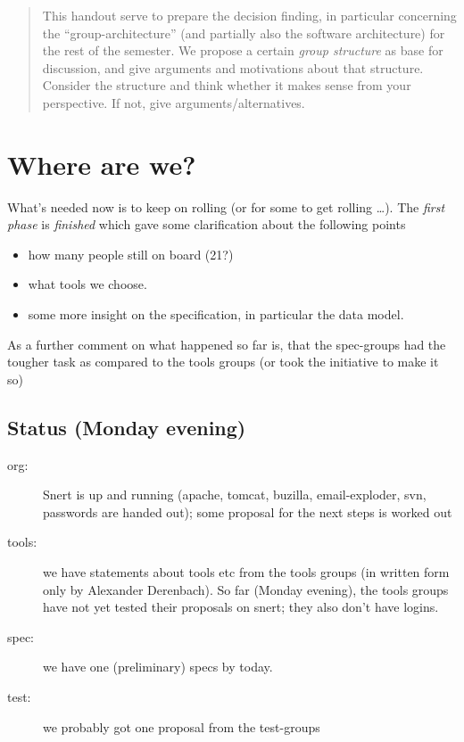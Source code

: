 \documentclass[11pt,handout,nologo]{handout}
\begin{document}
\thispagestyle{empty}





\begin{abstract}
  This handout serve to prepare the decision finding, in particular
  concerning the ``group-architecture'' (and partially also the software
  architecture) for the rest of the semester. We propose a certain
  \emph{group structure} as base for discussion, and give arguments and
  motivations about that structure.  Consider the structure and think
  whether it makes sense from your perspective. If not, give
  arguments/alternatives.
\end{abstract}

\section*{Where are we?}



What's needed now is to keep on rolling (or for some to get rolling
\ldots). The \emph{first phase} is \emph{finished} which gave some
clarification about the following points

\begin{itemize}
\item how many people still on board (21?)
\item what tools we choose.
\item some more insight on the specification, in particular the data model.
\end{itemize}

As a further comment on what happened so far is, that the spec-groups had
the tougher task as compared to the tools groups (or took the initiative to
make it so)


\subsection*{Status (Monday evening)}




\begin{description}
\item[org:] Snert is up and running (apache, tomcat, buzilla,
  email-exploder, svn, passwords are handed out); some proposal for the
  next steps is worked out
\item[tools:] we have statements about tools etc from the tools groups (in
  written form only by Alexander Derenbach). So far (Monday evening), the
  tools groups have not yet tested their proposals on snert; they also
  don't have logins.
\item[spec:] we have one (preliminary) specs by today.
\item[test:] we probably got one proposal from the test-groups
\end{description}
\end{document}
